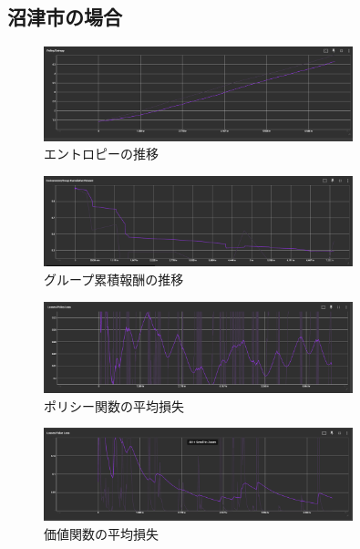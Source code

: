 \subsection{沼津市の場合}
\begin{figure}[H] 
  \centering 
  \includegraphics[width=0.8\textwidth]{Figures/NumazuSearch-Entropy.png}
  \caption{エントロピーの推移} 
  \label{fig:fig-01}
\end{figure}
\begin{figure}[H] 
  \centering 
  \includegraphics[width=0.8\textwidth]{Figures/NumazuSearch-GroupReward.png}
  \caption{グループ累積報酬の推移} 
  \label{fig:fig-01}
\end{figure}
\begin{figure}[H] 
  \centering 
  \includegraphics[width=0.8\textwidth]{Figures/NumazuSearch-PolicyLoss.png}
  \caption{ポリシー関数の平均損失} 
  \label{fig:fig-01}
\end{figure}
\begin{figure}[H] 
  \centering 
  \includegraphics[width=0.8\textwidth]{Figures/NumazuSearch-ValueLoss.png}
  \caption{価値関数の平均損失} 
  \label{fig:fig-01}
\end{figure}

